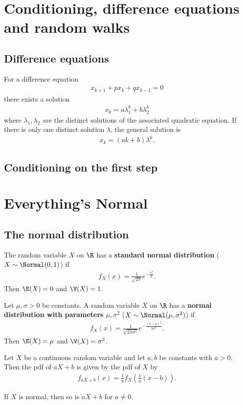 \documentclass{article}
\begin{document}
\section{Conditioning, difference equations and random walks}
\subsection{Difference equations}
\begin{theorem}
	For a difference equation
	\begin{align*}
		x_{k+1}+px_k+qx_{k-1}=0
	\end{align*}
	there exists a solution
	\begin{align*}
		x_k = a\lambda_1^k+b\lambda_2^k
	\end{align*}
	where $\lambda_1,\lambda_2$ are the distinct solutions of the associated quadratic equation.
	If there is only one distinct solution $\lambda$, the general solution is
	\begin{align*}
		x_k = (ak + b)\lambda^k.
	\end{align*}
\end{theorem}
\subsection{Conditioning on the first step}
\section{Everything's Normal}
\subsection{The normal distribution}
\begin{definition}
	The random variable $X$ on $\R$ has a \textbf{standard normal distribution}
	($X\sim\Normal(0,1)$) if
	\begin{align*}
		f_X(x)=\frac{1}{\sqrt{2\pi}}e^{-\frac{x^2}{2}}.
	\end{align*}
	Then $\E(X)=0$ and $\V(X)=1$.
\end{definition}
\begin{definition}
	Let $\mu,\sigma>0$ be constants. A random variable $X$ on $\R$ has
	a \textbf{normal distribution with parameters $\mu,\sigma^2$}
	($X\sim\Normal(\mu,\sigma^2)$) if
	\begin{align*}
		f_X(x) =\frac{1}{\sqrt{2\pi\sigma^2}}e^{-\frac{(x-\mu)^2}{2\sigma^2 }}.
	\end{align*}
	Then $\E(X)=\mu$ and $\V(X)=\sigma^2$.
\end{definition}
\begin{proposition}
	Let $X$ be a continuous random variable and let $a,b$ be constants
	with $a>0$. Then the pdf of $aX+b$ is given by the pdf of $X$ by
	\begin{align*}
		f_{aX+b}(x)=\frac{1}{a}f_X\left(\frac{1}{a}(x-b)\right).
	\end{align*}
\end{proposition}
\begin{theorem}
	If $X$ is normal, then so is $aX+b$ for $a\not=0$.
\end{theorem}
\end{document}
